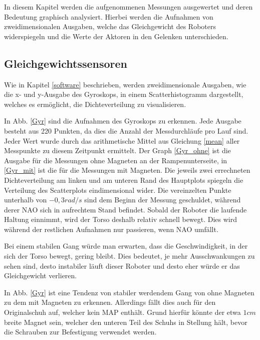 In diesem Kapitel werden die aufgenommenen Messungen ausgewertet und deren Bedeutung graphisch analysiert. Hierbei werden die Aufnahmen von zweidimensionalen Ausgaben, welche das Gleichgewicht des Roboters widerspiegeln und die Werte der Aktoren in den Gelenken unterschieden.

\subsection{Gleichgewichtssensoren} \label{gleichgewicht}

Wie in Kapitel \ref{software} beschrieben, werden zweidimensionale Ausgaben, wie die x- und y-Ausgabe des Gyroskops, in einem Scatterhistogramm dargestellt, welches es ermöglicht, die Dichteverteilung zu visualisieren. 

In Abb. \ref{Gyr} sind die Aufnahmen des Gyroskops zu erkennen. Jede Ausgabe besteht aus 220 Punkten, da dies die Anzahl der Messdurchläufe pro Lauf sind. Jeder Wert wurde durch das arithmetische Mittel aus Gleichung \eqref{mean} aller Messpunkte zu diesem Zeitpunkt ermittelt. Der Graph \ref{Gyr_ohne} ist die Ausgabe für die Messungen ohne Magneten an der Rampenunterseite, in \ref{Gyr_mit} ist die für die Messungen mit Magneten. Die jeweils zwei errechneten Dichteverteilung am linken und am unteren Rand des Hauptplots spiegeln die Verteilung des Scatterplots eindimensional wider. Die vereinzelten Punkte unterhalb von $-0,3 \unit{rad/s}$ sind dem Beginn der Messung geschuldet, während derer NAO sich in aufrechtem Stand befindet. Sobald der Roboter die laufende Haltung einnimmt, wird der Torso deshalb relativ schnell bewegt. Dies wird während der restlichen Aufnahmen nur passieren, wenn NAO umfällt. 


Bei einem stabilen Gang würde man erwarten, dass die Geschwindigkeit, in der sich der Torso bewegt, gering bleibt. Dies bedeutet, je mehr Ausschwankungen zu sehen sind, desto instabiler läuft dieser Roboter und desto eher würde er das Gleichgewicht verlieren. 

In Abb. \ref{Gyr} ist eine Tendenz von stabiler werdendem Gang von ohne Magneten zu dem mit Magneten zu erkennen. Allerdings fällt dies auch für den Originalschuh auf, welcher kein MAP enthält. Grund hierfür könnte der etwa $1\unit{cm}$ breite Magnet sein, welcher den unteren Teil des Schuhs in Stellung hält, bevor die Schrauben zur Befestigung verwendet werden.

